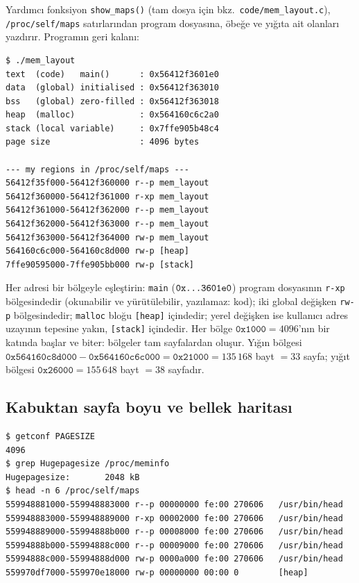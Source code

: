 \documentclass[11pt,a4paper]{article}
\newcommand{\cmd}[1]{\texttt{#1}}
\begin{document}
Yardımcı fonksiyon \cmd{show\_maps()} (tam dosya için bkz.\ \texttt{code/mem\_layout.c}), \texttt{/proc/self/maps} satırlarından program dosyasına, öbeğe ve yığıta ait olanları yazdırır. Programın geri kalanı:


\vspace{-0.6em}


\begin{lstlisting}[style=term]
$ ./mem_layout
text  (code)   main()      : 0x56412f3601e0
data  (global) initialised : 0x56412f363010
bss   (global) zero-filled : 0x56412f363018
heap  (malloc)             : 0x564160c6c2a0
stack (local variable)     : 0x7ffe905b48c4
page size                  : 4096 bytes

--- my regions in /proc/self/maps ---
56412f35f000-56412f360000 r--p mem_layout
56412f360000-56412f361000 r-xp mem_layout
56412f361000-56412f362000 r--p mem_layout
56412f362000-56412f363000 r--p mem_layout
56412f363000-56412f364000 rw-p mem_layout
564160c6c000-564160c8d000 rw-p [heap]
7ffe90595000-7ffe905bb000 rw-p [stack]
\end{lstlisting}

Her adresi bir bölgeyle eşleştirin: \cmd{main} ($\texttt{0x\dots3601e0}$) program dosyasının \texttt{r-xp} bölgesindedir (okunabilir ve yürütülebilir, yazılamaz: kod); iki global değişken \texttt{rw-p} bölgesindedir; \cmd{malloc} bloğu \texttt{[heap]} içindedir; yerel değişken ise kullanıcı adres uzayının tepesine yakın, \texttt{[stack]} içindedir. Her bölge $\texttt{0x1000} = 4096$'nın bir katında başlar ve biter: bölgeler tam sayfalardan oluşur. Yığın bölgesi $\texttt{0x564160c8d000} - \texttt{0x564160c6c000} = \texttt{0x21000} = 135\,168$ bayt $= 33$ sayfa; yığıt bölgesi $\texttt{0x26000} = 155\,648$ bayt $= 38$ sayfadır.

\subsection{Kabuktan sayfa boyu ve bellek haritası}

\begin{lstlisting}[style=term]
$ getconf PAGESIZE
4096
$ grep Hugepagesize /proc/meminfo
Hugepagesize:       2048 kB
$ head -n 6 /proc/self/maps
559948881000-559948883000 r--p 00000000 fe:00 270606   /usr/bin/head
559948883000-559948889000 r-xp 00002000 fe:00 270606   /usr/bin/head
559948889000-55994888b000 r--p 00008000 fe:00 270606   /usr/bin/head
55994888b000-55994888c000 r--p 00009000 fe:00 270606   /usr/bin/head
55994888c000-55994888d000 rw-p 0000a000 fe:00 270606   /usr/bin/head
559970df7000-559970e18000 rw-p 00000000 00:00 0        [heap]
\end{lstlisting}
\end{document}
